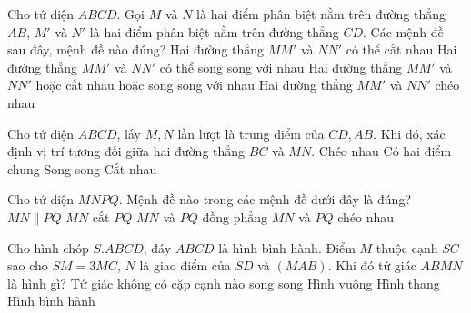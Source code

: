 \begin{ex}%
		Cho tứ diện $ABCD$. Gọi $M$ và $N$ là hai điểm phân biệt nằm trên đường thẳng $AB$, $M'$ và $N'$ là hai điểm phân biệt nằm trên đường thẳng $CD$. Các mệnh đề sau đây, mệnh đề nào đúng?	
		\choice
		{Hai đường thẳng $MM'$ và $NN'$ có thể cắt nhau}
		{Hai đường thẳng $MM'$ và $NN'$ có thể song song với nhau}
		{Hai đường thẳng $MM'$ và $NN'$ hoặc cắt nhau hoặc song song với nhau}
		{\True Hai đường thẳng $MM'$ và $NN'$ chéo nhau}
\end{ex}

\begin{ex}%
	Cho tứ diện $ABCD$, lấy $M, N$ lần lượt là trung điểm của $CD, AB$. Khi đó, xác định vị trí tương đối giữa hai đường thẳng $BC$ và $MN$.
	\choice
	{\True Chéo nhau}
	{Có hai điểm chung}	
	{Song song}	
	{Cắt nhau}
\end{ex}

\begin{ex}%
	Cho tứ diện $MNPQ$. Mệnh đề nào trong các mệnh đề dưới đây là đúng?
	\choice
	{$MN\parallel PQ$}
	{$MN$ cắt $PQ$}
	{$MN$ và $PQ$ đồng phẳng}	
	{\True $MN$ và $PQ$ chéo nhau}
\end{ex}

\begin{ex}%
	Cho hình chóp $S.ABCD$, đáy $ABCD$ là hình bình hành. Điểm $M$ thuộc cạnh $SC$ sao cho $SM=3MC$, $N$ là giao điểm của $SD$ và $(MAB)$. Khi đó tứ giác $ABMN$ là hình gì?
	\choice
	{Tứ giác không có cặp cạnh nào song song}
	{Hình vuông}
	{\True Hình thang}
	{Hình bình hành}
\end{ex}

